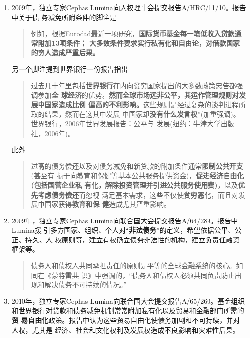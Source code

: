 \begin{enumerate}
\item 2009年，独立专家Cephas Lumina向人权理事会提交报告A/HRC/11/10。报告中关于债
  务减免所附条件的脚注是
  \begin{quotation}
    例如，根据Eurodad最近一项研究，\textbf{国际货币基金每一笔低收入贷款通常附加13项条件；
    大多数条件要求实行私有化和自由论，对借款国家的穷人造成严重后果。}
\end{quotation}

另一个脚注提到世界银行一份报告指出
\begin{quotation}
  过去几十年里包括\textbf{世界银行}在内向贫穷国家提出的大多数政策忠告都强调参加\textbf{全
    球经济}的优势。\textbf{然而全球市场远非公平，其运作管理规则对发展中国家造成比例
    偏高的不利影响。}这些规则是经过复杂的谈判进程所取的结果，然而在这其中发展
  中国家却\textbf{没有什么发言权}”(加重强调)。世界银行，2006年世界发展报告：公平与
  发展(纽约：牛津大学出版社，2006年)。
\end{quotation}

此外
\begin{quotation}
  过高的债务偿还以及对债务减免和新贷款的附加条件通常\textbf{限制公共开支}(甚至有
  损于向教育和保健等基本公共服务提供资金)，\textbf{促进经济自由化(包括国营企业私
    有化，解除投资管理并引进公共服务使用费)}，以及\textbf{优先考虑债务偿还}而忽视
  满足基本需求，这些不仅使\textbf{贫穷恶化}，而且对发展中国家获得\textbf{教育和保
    健}造成尤其严重影响。
  \end{quotation}

\item 2009年，独立专家Cephas Lumina向联合国大会提交报告A/64/289。报告中Lumina援
  引多方国家、组织、个人对“\textbf{非法债务}”的定义，希望依据公平、公正、持久、人
  权原则等，建立有权确立债务非法性的机构，建立负责任融资框架等。
  \begin{quotation}
    债务人和债权人共同承担责任的原则是平等的全球金融系统的核心。如同在《蒙特雷共
    识》中强调的，“债务人和债权人必须共同负责防止出现和解决债务不可持续的情况。”
  \end{quotation}

\item 2010年，独立专家Cephas Lumina向联合国大会提交报告A/65/260。基金组织
  和世界银行对贷款和债务减免机制常常附加私有化以及贸易和金融部门所需的\textbf{贸
    易自由化}政策。报告中认为这些贸易自由化使债务加剧和不可持续，并对人权，尤其是
  经济、社会和文化权利及发展权造成不良影响和灾难性后果。


\end{enumerate}
